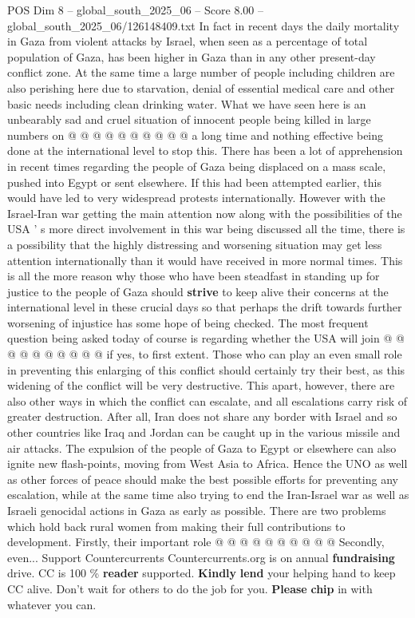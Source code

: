 \begin{textsample}{POS Dim 8 – global\_south\_2025\_06 – Score 8.00 – global\_south\_2025\_06/126148409.txt}
In fact in recent days the daily mortality in Gaza from violent attacks by Israel, when seen as a percentage of total population of Gaza, has been higher in Gaza than in any other present-day conflict zone.
At the same time a large number of people including children are also perishing here due to starvation, denial of essential medical care and other basic needs including clean drinking water.
What we have seen here is an unbearably sad and cruel situation of innocent people being killed in large numbers on @ @ @ @ @ @ @ @ @ @ a long time and nothing effective being done at the international level to stop this.
There has been a lot of apprehension in recent times regarding the people of Gaza being displaced on a mass scale, pushed into Egypt or sent elsewhere.
If this had been attempted earlier, this would have led to very widespread protests internationally.
However with the Israel-Iran war getting the main attention now along with the possibilities of the USA ' s more direct involvement in this war being discussed all the time, there is a possibility that the highly distressing and worsening situation may get less attention internationally than it would have received in more normal times.
This is all the more reason why those who have been steadfast in standing up for justice to the people of Gaza should \textbf{strive} to keep alive their concerns at the international level in these crucial days so that perhaps the drift towards further worsening of injustice has some hope of being checked.
The most frequent question being asked today of course is regarding whether the USA will join @ @ @ @ @ @ @ @ @ @ if yes, to first extent.
Those who can play an even small role in preventing this enlarging of this conflict should certainly try their best, as this widening of the conflict will be very destructive.
This apart, however, there are also other ways in which the conflict can escalate, and all escalations carry risk of greater destruction.
After all, Iran does not share any border with Israel and so other countries like Iraq and Jordan can be caught up in the various missile and air attacks.
The expulsion of the people of Gaza to Egypt or elsewhere can also ignite new flash-points, moving from West Asia to Africa.
Hence the UNO as well as other forces of peace should make the best possible efforts for preventing any escalation, while at the same time also trying to end the Iran-Israel war as well as Israeli genocidal actions in Gaza as early as possible.
There are two problems which hold back rural women from making their full contributions to development.
Firstly, their important role @ @ @ @ @ @ @ @ @ @ Secondly, even...
Support Countercurrents Countercurrents.org is on annual \textbf{fundraising} drive.
CC is 100 \% \textbf{reader} supported. \textbf{Kindly} \textbf{lend} your helping hand to keep CC alive.
Don't wait for others to do the job for you. \textbf{Please} \textbf{chip} in with whatever you can.

\end{textsample}
